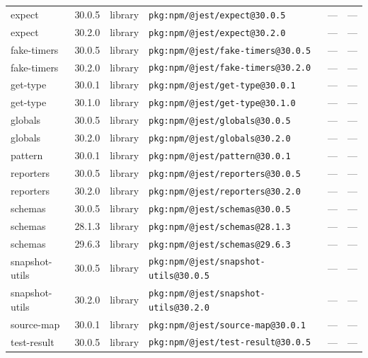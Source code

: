\documentclass[11pt,a4paper]{article}
\begin{document}
\begin{longtable}{|p{4cm}|p{2cm}|p{1.6cm}|p{5cm}|p{1.5cm}|p{3.5cm}|}
\raggedright expect & 30.0.5 & library & \small\texttt{pkg:npm/@jest/expect@30.0.5} & — & \small — \\
\raggedright expect & 30.2.0 & library & \small\texttt{pkg:npm/@jest/expect@30.2.0} & — & \small — \\
\raggedright fake-timers & 30.0.5 & library & \small\texttt{pkg:npm/@jest/fake-timers@30.0.5} & — & \small — \\
\raggedright fake-timers & 30.2.0 & library & \small\texttt{pkg:npm/@jest/fake-timers@30.2.0} & — & \small — \\
\raggedright get-type & 30.0.1 & library & \small\texttt{pkg:npm/@jest/get-type@30.0.1} & — & \small — \\
\raggedright get-type & 30.1.0 & library & \small\texttt{pkg:npm/@jest/get-type@30.1.0} & — & \small — \\
\raggedright globals & 30.0.5 & library & \small\texttt{pkg:npm/@jest/globals@30.0.5} & — & \small — \\
\raggedright globals & 30.2.0 & library & \small\texttt{pkg:npm/@jest/globals@30.2.0} & — & \small — \\
\raggedright pattern & 30.0.1 & library & \small\texttt{pkg:npm/@jest/pattern@30.0.1} & — & \small — \\
\raggedright reporters & 30.0.5 & library & \small\texttt{pkg:npm/@jest/reporters@30.0.5} & — & \small — \\
\raggedright reporters & 30.2.0 & library & \small\texttt{pkg:npm/@jest/reporters@30.2.0} & — & \small — \\
\raggedright schemas & 30.0.5 & library & \small\texttt{pkg:npm/@jest/schemas@30.0.5} & — & \small — \\
\raggedright schemas & 28.1.3 & library & \small\texttt{pkg:npm/@jest/schemas@28.1.3} & — & \small — \\
\raggedright schemas & 29.6.3 & library & \small\texttt{pkg:npm/@jest/schemas@29.6.3} & — & \small — \\
\raggedright snapshot-utils & 30.0.5 & library & \small\texttt{pkg:npm/@jest/snapshot-utils@30.0.5} & — & \small — \\
\raggedright snapshot-utils & 30.2.0 & library & \small\texttt{pkg:npm/@jest/snapshot-utils@30.2.0} & — & \small — \\
\raggedright source-map & 30.0.1 & library & \small\texttt{pkg:npm/@jest/source-map@30.0.1} & — & \small — \\
\raggedright test-result & 30.0.5 & library & \small\texttt{pkg:npm/@jest/test-result@30.0.5} & — & \small — \\

\end{longtable}
\end{document}
